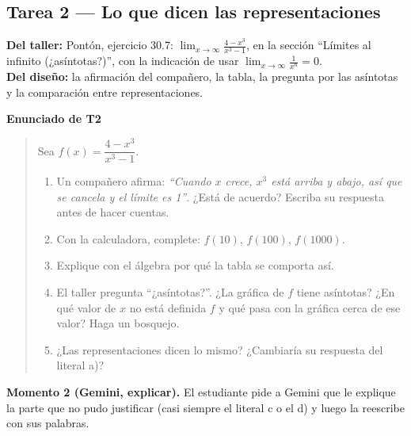 \documentclass[11pt,letterpaper]{article}
\newenvironment{tarea}[1]{\par\medskip\noindent\textbf{Enunciado de #1}\begin{quote}}{\end{quote}}
\newenvironment{origen}{\par\small\noindent\ignorespaces}{\par\normalsize}
\begin{document}
\subsection*{Tarea 2 --- Lo que dicen las representaciones}

\begin{origen}
\textbf{Del taller:} Pontón, ejercicio 30.7: $\lim_{x\to\infty}\frac{4-x^3}{x^3-1}$, en la sección ``Límites al infinito (¿asíntotas?)'', con la indicación de usar $\lim_{x\to\infty}\frac{1}{x^n}=0$.\\
\textbf{Del diseño:} la afirmación del compañero, la tabla, la pregunta por las asíntotas y la comparación entre representaciones.
\end{origen}

\begin{tarea}{T2}
Sea $f(x)=\dfrac{4-x^3}{x^3-1}$.
\begin{enumerate}[label=\alph*)]
  \item Un compañero afirma: \emph{``Cuando $x$ crece, $x^3$ está arriba y abajo, así que se cancela y el límite es 1''}. ¿Está de acuerdo? Escriba su respuesta antes de hacer cuentas.
  \item Con la calculadora, complete: $f(10)$, $f(100)$, $f(1000)$.
  \item Explique con el álgebra por qué la tabla se comporta así.
  \item El taller pregunta ``¿asíntotas?''. ¿La gráfica de $f$ tiene asíntotas? ¿En qué valor de $x$ no está definida $f$ y qué pasa con la gráfica cerca de ese valor? Haga un bosquejo.
  \item ¿Las representaciones dicen lo mismo? ¿Cambiaría su respuesta del literal a)?
\end{enumerate}
\end{tarea}

\textbf{Momento 2 (Gemini, explicar).} El estudiante pide a Gemini que le explique la parte que no pudo justificar (casi siempre el literal c o el d) y luego la reescribe con sus palabras.
\end{document}
